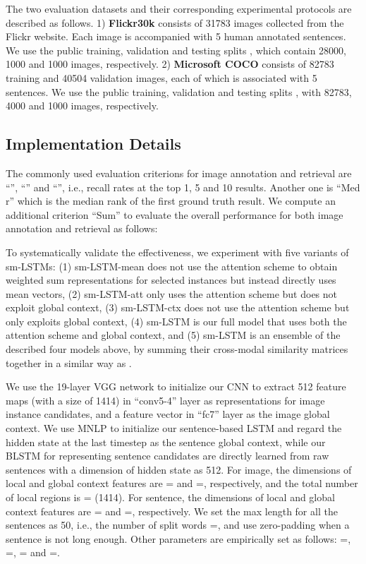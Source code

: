 \documentclass[10pt,twocolumn,letterpaper]{article}
\begin{document}
The two evaluation datasets and their corresponding experimental protocols are described as follows.
1) \textbf{Flickr30k} \cite{young2014image}
consists of 31783 images collected from the Flickr website.
Each image is accompanied with 5 human annotated sentences.
We use the public training, validation and testing splits \cite{kiros2014unifying}, which
contain 28000, 1000 and 1000 images, respectively.
2) \textbf{Microsoft COCO} \cite{lin2014microsoft} consists of 82783
training and 40504 validation images, each of which is associated with 5 sentences.
We use the public training, validation and testing splits \cite{kiros2014unifying}, with
82783, 4000 and 1000 images, respectively.






\subsection{Implementation Details} \label{sent:details}
The commonly used evaluation criterions for image annotation and retrieval
are ``'', ``'' and ``'',
i.e., recall rates at the top 1, 5 and 10 results.
Another one is ``Med r'' which is the median rank of the first ground truth result.
We compute an additional criterion ``Sum'' to evaluate the overall performance for
both image annotation and retrieval as follows:


To systematically validate the effectiveness,
we experiment with five variants of sm-LSTMs:
(1) sm-LSTM-mean does not use the attention scheme to obtain weighted sum
representations for selected instances but instead directly uses mean vectors,
(2) sm-LSTM-att only uses the attention scheme but does not exploit global context,
(3) sm-LSTM-ctx does not use the attention scheme but only exploits global context,
(4) sm-LSTM is our full model that uses both the attention scheme and global context,
and (5) sm-LSTM is an ensemble of the described four models above,
by summing their cross-modal similarity matrices together in a similar way as \cite{ma2015multimodal}.



We use the 19-layer VGG network \cite{simonyan2014very} to initialize
our CNN to extract 512 feature maps
(with a size of 1414) in ``conv5-4'' layer
as representations for image instance candidates,
and a feature vector in ``fc7'' layer as the image global context.
We use MNLP \cite{kiros2014unifying} to initialize our sentence-based LSTM
and regard the hidden state at the last timestep as the sentence global context,
while our BLSTM for representing sentence candidates are directly learned from raw sentences with a dimension of hidden state as 512.
For image, the dimensions of local and global context features are = and =, respectively,
and the total number of local regions is = (1414).
For sentence, the dimensions of local and global context features are = and =, respectively.
We set the max length for all the sentences as 50, i.e., the number of split words =,
and use zero-padding when a sentence is not long enough.
Other parameters are empirically set as follows:
=, =, = and =.
\end{document}
